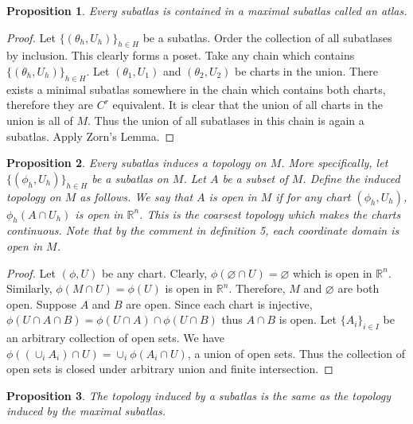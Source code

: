 \documentclass{article}
\theoremstyle{problemstyle}
\theoremstyle{problemstyle}
\theoremstyle{problemstyle}
\theoremstyle{problemstyle}
\newtheorem{proposition}{Proposition}
\theoremstyle{problemstyle}
\theoremstyle{problemstyle}
\begin{document}
\begin{proposition}\label{existance of maximal atlases}
Every subatlas is contained in a maximal subatlas called an atlas. 
\end{proposition}

\begin{proof}
Let $\{(\theta_h,U_h)\}_{h \in H}$ be a subatlas. Order the collection of all subatlases by inclusion. This clearly forms a poset. Take any chain which contains $\{(\theta_h,U_h)\}_{h \in H}$.  Let $(\theta_1,U_1)$ and $(\theta_2,U_2)$ be charts in the union. There exists a minimal subatlas somewhere in the chain which contains both charts, therefore they are $C^r$ equivalent. It is clear that the union of all charts in the union is all of $M$. Thus the union of all subatlases in this chain is again a subatlas. Apply Zorn's Lemma. 
\end{proof}

\begin{proposition}
Every subatlas induces a topology on $M$.  More specifically, let $\{(\phi_h,U_h)\}_{h \in H}$ be a subatlas on $M$. Let $A$ be a subset of $M$. Define the induced topology on $M$ as follows. We say that $A$ is open in $M$ if for any chart $(\phi_h,U_h)$, $\phi_h(A \cap U_h)$ is open in $\mathbb{R}^n$. This is the coarsest topology which makes the charts continuous. Note that by the comment in definition 5, each coordinate domain is open in $M$. 
\end{proposition}

\begin{proof}
Let $(\phi, U)$ be any chart. Clearly, $\phi(\varnothing \cap U) = \varnothing$ which is open in $\mathbb{R}^n$. Similarly,  $\phi(M \cap U) = \phi(U)$ is open in $\mathbb{R}^n$. Therefore, $M$ and $\varnothing$ are both open. Suppose $A$ and $B$ are open. Since each chart is injective, $\phi(U \cap A \cap B) = \phi(U \cap A) \cap \phi(U\cap B)$ thus $A \cap B$ is open. Let $\{A_i\}_{i \in I}$ be an arbitrary collection of open sets. We have $\phi((\cup_iA_i) \cap U) = \cup_i\phi(A_i \cap U)$, a union of open sets. Thus the collection of open sets is closed under arbitrary union and finite intersection. 
\end{proof}

\begin{proposition}
The topology induced by a subatlas is the same as the topology induced by the maximal subatlas.
\end{proposition}
\end{document}
